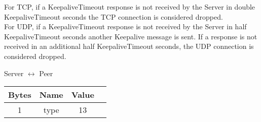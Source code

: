 For TCP, if a KeepaliveTimeout response is not received by the Server in
double KeepaliveTimeout seconds the TCP connection is considered dropped.\\

For UDP, if a KeepaliveTimeout response is not received by the Server in
half  KeepaliveTimeout seconds another Keepalive message is sent. If a response is not received in
an additional half KeepaliveTimeout seconds, the UDP connection is considered dropped.

\begin{center}
    Server $\leftrightarrow$ Peer\\
    \begin{tabular}{|c|c|c|c|}
        \hline
        \textbf{Bytes} & \textbf{Name} & \textbf{Value} \\
        \hline
        1              & type          & 13              \\
        \hline
    \end{tabular}
\end{center}